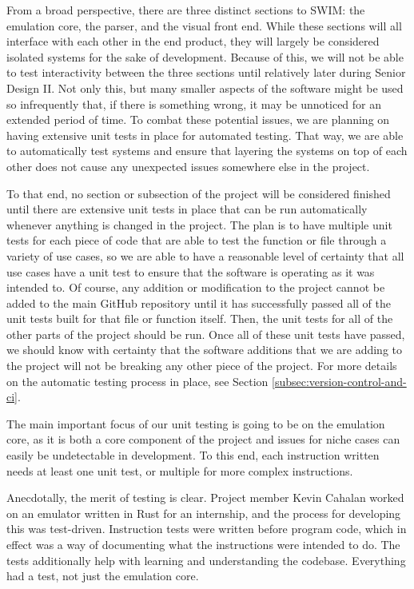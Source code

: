 \documentclass[
    paper=letter,
    parskip=half,
    fontsize=12pt,
    titlepage=firstiscover,
    toc=bibliography,
    numbers=endperiod
]{scrartcl}
\begin{document}
From a broad perspective, there are three distinct sections to SWIM: the
emulation core, the parser, and the visual front end. While these
sections will all interface with each other in the end product, they
will largely be considered isolated systems for the sake of development.
Because of this, we will not be able to test interactivity between the
three sections until relatively later during Senior Design II. Not only
this, but many smaller aspects of the software might be used so
infrequently that, if there is something wrong, it may be unnoticed for
an extended period of time. To combat these potential issues, we are
planning on having extensive unit tests in place for automated testing.
That way, we are able to automatically test systems and ensure that
layering the systems on top of each other does not cause any unexpected
issues somewhere else in the project.

To that end, no section or subsection of the project will be considered
finished until there are extensive unit tests in place that can be run
automatically whenever anything is changed in the project. The plan is
to have multiple unit tests for each piece of code that are able to test
the function or file through a variety of use cases, so we are able to
have a reasonable level of certainty that all use cases have a unit test
to ensure that the software is operating as it was intended to. Of
course, any addition or modification to the project cannot be added to
the main GitHub repository until it has successfully passed all of the
unit tests built for that file or function itself. Then, the unit tests
for all of the other parts of the project should be run. Once all of
these unit tests have passed, we should know with certainty that the
software additions that we are adding to the project will not be
breaking any other piece of the project. For more details on the
automatic testing process in place, see Section
\ref{subsec:version-control-and-ci}.

The main important focus of our unit testing is going to be on the
emulation core, as it is both a core component of the project and issues
for niche cases can easily be undetectable in development. To this end,
each instruction written needs at least one unit test, or multiple for
more complex instructions.

Anecdotally, the merit of testing is clear. Project member Kevin Cahalan
worked on an emulator written in Rust for an internship, and the process
for developing this was test-driven. Instruction tests were written
before program code, which in effect was a way of documenting what the
instructions were intended to do. The tests additionally help with
learning and understanding the codebase. Everything had a test, not just
the emulation core.
\end{document}
